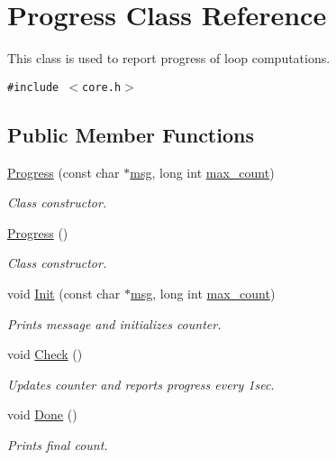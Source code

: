 \hypertarget{classProgress}{
\section{Progress Class Reference}
\label{classProgress}
}
This class is used to report progress of loop computations.  


{\tt \#include $<$core.h$>$}

\subsection*{Public Member Functions}
\begin{CompactItemize}
\item 
\hyperlink{classProgress_fc6164b4ac61db61319559b1b8cc99f2}{Progress} (const char $\ast$\hyperlink{classProgress_7eeeaec06e0ab3c1fc871ccb225ede3d}{msg}, long int \hyperlink{classProgress_9cfb7b6b93778e9c617c38ab26d3d0a0}{max\_\-count})
\begin{CompactList}\small\item\em Class constructor. \item\end{CompactList}\item 
\hypertarget{classProgress_01d83f02dc49939dd5d14057932a8a8d}{
\hyperlink{classProgress_01d83f02dc49939dd5d14057932a8a8d}{Progress} ()}
\label{classProgress_01d83f02dc49939dd5d14057932a8a8d}

\begin{CompactList}\small\item\em Class constructor. \item\end{CompactList}\item 
void \hyperlink{classProgress_3400f3a809c40b45b63c5196e701db8a}{Init} (const char $\ast$\hyperlink{classProgress_7eeeaec06e0ab3c1fc871ccb225ede3d}{msg}, long int \hyperlink{classProgress_9cfb7b6b93778e9c617c38ab26d3d0a0}{max\_\-count})
\begin{CompactList}\small\item\em Prints message and initializes counter. \item\end{CompactList}\item 
void \hyperlink{classProgress_58375cdfa5fc9e27d3db6c216c6c2248}{Check} ()
\begin{CompactList}\small\item\em Updates counter and reports progress every 1sec. \item\end{CompactList}\item 
void \hyperlink{classProgress_cabb2c4a989f7583dab1c75eb173ebf7}{Done} ()
\begin{CompactList}\small\item\em Prints final count. \item\end{CompactList}\end{CompactItemize}
